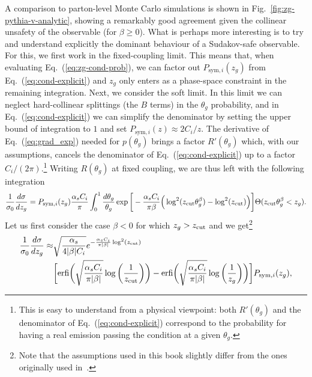 A comparison to parton-level Monte Carlo simulations is shown in
Fig.~\ref{fig:zg-pythia-v-analytic}, showing a remarkably good
agreement given the collinear unsafety of the observable (for
$\beta\ge 0$).
%
What is perhaps more interesting is to try and understand explicitly
the dominant behaviour of a Sudakov-safe observable.
%
For this, we first work in the fixed-coupling limit. This means that,
when evaluating Eq.~(\ref{eq:zg-cond-prob}), we can factor out
$P_{\text{sym},i}(z_g)$ from Eq.~(\ref{eq:cond-explicit}) and $z_g$ only
enters as a phase-space constraint in the remaining integration.
%
Next, we consider the soft limit. In this limit we can neglect
hard-collinear splittings (\ie the $B$ terms) in the $\theta_g$
probability, and in Eq.~(\ref{eq:cond-explicit}) we can simplify the
denominator by setting the upper bound of integration to $1$ and set
$P_{\text{sym},i}(z)\approx 2C_i/z$.
%
The derivative of Eq.~(\ref{eq:grad_exp}) needed for $p(\theta_g)$ brings
a factor $R'(\theta_g)$ which, with our assumptions, cancels the
denominator of Eq.~(\ref{eq:cond-explicit}) up to a factor
$C_i/(2\pi)$.\footnote{This is easy to understand from a physical
  viewpoint: both $R'(\theta_g)$ and the denominator
  of Eq.~(\ref{eq:cond-explicit}) correspond to the probability for having
  a real emission passing the \SD condition at a given $\theta_g$.}
Writing $R(\theta_g)$ at fixed coupling, we are thus left with the
following integration
\begin{equation}\label{eq:res_zf}
  \frac{1}{\sigma_0}\frac{d\sigma}{dz_g}
  = P_{\text{sym},i}(z_g)\frac{\alpha_sC_i}{\pi}
  \int_0^1\frac{d\theta_g}{\theta_g}
  \exp\bigg[-\frac{\alpha_sC_i}{\pi\beta}\Big(\log^2(z_{\text{cut}}\theta_g^\beta)-\log^2(z_{\text{cut}})\Big)\bigg]
  \Theta(z_{\text{cut}}\theta_g^\beta<z_g).
\end{equation}
%
Let us first consider the case $\beta<0$ for which $z_g>z_{\text{cut}}$ and we
get\footnote{Note that the assumptions used in this book slightly
  differ from the ones originally used in~\cite{Larkoski:2015lea}.}
\begin{align} \label{eq:res_zf_betaneg}
  \frac{1}{\sigma_0}\frac{d \sigma}{d z_g}
  \approx&\sqrt{\frac{\alpha_s}{4|\beta| C_i}}
           e^{-{\frac{\alpha_s C_i}{\pi |\beta|}\log^2(z_\text{cut})}}\\
  &
    \bigg[ \text{erfi} \bigg( \sqrt{\frac{\alpha_s C_i}{\pi|\beta|} }
                              \log\bigg(  \frac{1}{z_{\text{cut}}}\bigg) \bigg)
         - \text{erfi} \bigg( \sqrt{\frac{\alpha_s C_i}{\pi|\beta|} }
                              \log\bigg(  \frac{1}{z_g}\bigg)\bigg) \bigg]
    P_{\text{sym},i}(z_g),\nonumber
\end{align}
